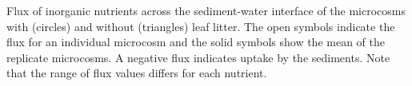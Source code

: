 \label{fig:nut_flux}

Flux of inorganic nutrients across the sediment-water interface of the microcosms with (circles) and without (triangles) leaf litter. The open symbols indicate the flux for an individual microcosm and the solid symbols show the mean of the replicate microcosms. A negative flux indicates uptake by the sediments.  Note that the range of flux values differs for each nutrient.